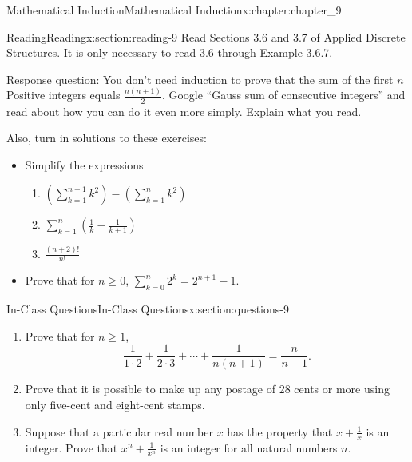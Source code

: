 \documentclass[oneside,10pt,]{book}
\numberwithin{equation}{section}
\begin{document}
\begin{chapterptx}{Mathematical Induction}{}{Mathematical Induction}{}{}{x:chapter:chapter_9}
\index{}%
%
%
\typeout{************************************************}
\typeout{************************************************}
%
\begin{sectionptx}{Reading}{}{Reading}{}{}{x:section:reading-9}
Read Sections 3.6 and 3.7 of Applied Discrete Structures. It is only necessary to read 3.6 through Example 3.6.7.%
\par
Response question: You don’t need induction to prove that the sum of the first \(n\) Positive integers equals \(\frac{n(n+1)}{2}\). Google “Gauss sum of consecutive integers” and read about how you can do it even more simply. Explain what you read.%
\par
Also, turn in solutions to these exercises:%
\begin{itemize}[label=\textbullet]
\item{}Simplify the expressions%
\begin{enumerate}[label=(\alph*)]
\item{}\((\sum_{k=1}^{n+1}k^2) -(\sum_{k=1}^n k^2)\)%
\item{}\(\sum_{k=1}^n (\frac{1}{k}-\frac{1}{k+1})\)%
\item{}\(\frac{(n+2)!}{n!}\)%
\end{enumerate}
%
\item{}Prove that for \(n \ge 0\), \(\sum_{k=0}^n {2^k} = 2^{n+1}-1\).%
\end{itemize}
%
\end{sectionptx}
%
%
\typeout{************************************************}
\typeout{************************************************}
%
\begin{sectionptx}{In-Class Questions}{}{In-Class Questions}{}{}{x:section:questions-9}
%
\begin{enumerate}[label=\arabic*.]
\item{}Prove that for \(n\geq 1\),%
\begin{equation*}
\frac{1}{1\cdot 2 }+ \frac{1}{2\cdot 3}+ \cdots  + \frac{1}{n(n+1)}= \frac{n}{n+1}.
\end{equation*}
%
\item\hypertarget{x:li:stamp-problem}{}Prove that it is possible to make up any postage of 28 cents or more using only five-cent and eight-cent stamps.%
\item{}Suppose that a particular real number \(x\) has the property that \(x + \frac{1}{x}\) is an integer.  Prove that \(x^n + \frac{1}{x^n}\) is an integer for all natural numbers \(n\).%
\end{enumerate}
%
\end{sectionptx}
\end{chapterptx}
\end{document}

